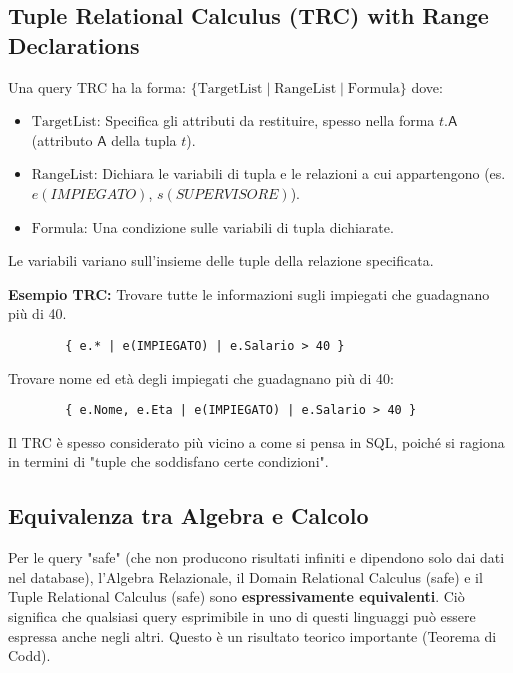 \documentclass{article}
\newcommand{\Rel}[1]{\textit{#1}} %
\newcommand{\Attr}[1]{\textsf{#1}} %
\begin{document}
	\subsection{Tuple Relational Calculus (TRC) with Range Declarations}
	Una query TRC ha la forma:
	$\{ \text{TargetList} \mid \text{RangeList} \mid \text{Formula} \}$
	dove:
	\begin{itemize}
		\item $\text{TargetList}$: Specifica gli attributi da restituire, spesso nella forma $t.\Attr{A}$ (attributo $\Attr{A}$ della tupla $t$).
		\item $\text{RangeList}$: Dichiara le variabili di tupla e le relazioni a cui appartengono (es. $e(\Rel{IMPIEGATO})$, $s(\Rel{SUPERVISORE})$).
		\item $\text{Formula}$: Una condizione sulle variabili di tupla dichiarate.
	\end{itemize}
	Le variabili variano sull'insieme delle tuple della relazione specificata.
	
	\textbf{Esempio TRC:} Trovare tutte le informazioni sugli impiegati che guadagnano più di 40.
	\begin{verbatim}
		{ e.* | e(IMPIEGATO) | e.Salario > 40 }
	\end{verbatim}
	Trovare nome ed età degli impiegati che guadagnano più di 40:
	\begin{verbatim}
		{ e.Nome, e.Eta | e(IMPIEGATO) | e.Salario > 40 }
	\end{verbatim}
	Il TRC è spesso considerato più vicino a come si pensa in SQL, poiché si ragiona in termini di "tuple che soddisfano certe condizioni".
	
	\subsection{Equivalenza tra Algebra e Calcolo}
	Per le query "safe" (che non producono risultati infiniti e dipendono solo dai dati nel database), l'Algebra Relazionale, il Domain Relational Calculus (safe) e il Tuple Relational Calculus (safe) sono \textbf{espressivamente equivalenti}. Ciò significa che qualsiasi query esprimibile in uno di questi linguaggi può essere espressa anche negli altri. Questo è un risultato teorico importante (Teorema di Codd).
	
\end{document}
